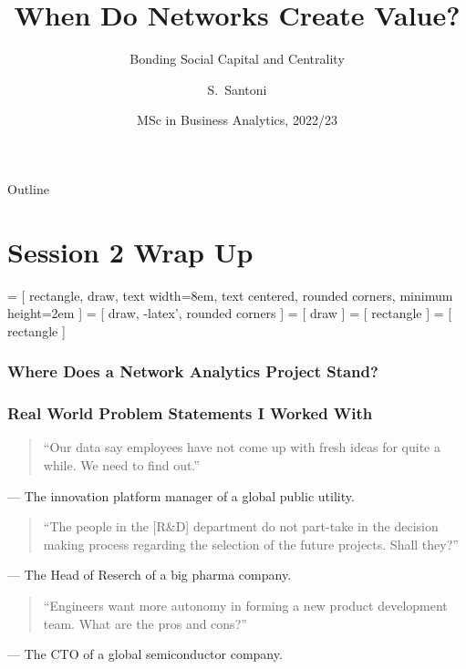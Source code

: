 \documentclass[notes, aspectratio=1610]{beamer}
\title[Networks and Value Creation]
{When Do Networks Create Value?}
\subtitle{Bonding Social Capital and Centrality}
\author{S.~Santoni\inst{1}\inst{2}}
\institute{
	\inst{1}%
	Bayes Business School
	\and
	\inst{2}%
	Soundcloud
	}
\date{MSc in Business Analytics, 2022/23}
\begin{document}
\begin{frame}
	\titlepage
\end{frame}

\begin{frame}{Outline}
	\tableofcontents
\end{frame}

\section{Session 2 Wrap Up}

\begin{frame}
 = [
	rectangle, 
	draw,
	text width=8em,
	text centered,
	rounded corners,
	minimum height=2em
	]
 = [
	draw,
	-latex',
	rounded corners
	]
 = [
	draw
	]
 = [
	rectangle
	]
 = [
	rectangle
	]
	\frametitle{Where Does a Network Analytics Project Stand?}
	\begin{figure}
	\end{figure}	
\end{frame}

\begin{frame}
	\frametitle{Real World Problem Statements I Worked With}
	\begin{quote}
		``Our data say employees have not come up with 
		fresh ideas for quite a while. We need to find out.''
	\end{quote}
	\raggedleft --- The innovation platform manager of a global public utility.

	\vspace{1em}

	\begin{quote}
		``The people in the [R\&D] department do not part-take in 
		the decision making process regarding the selection 
		of the future projects. Shall they?''
	\end{quote}
	\raggedleft --- The Head of Reserch of a big pharma company.
	\vspace{1em}

	\begin{quote}
		``Engineers want more autonomy in forming a new product 
		development team. What are the pros and cons?''
	\end{quote}
	\raggedleft --- The CTO of a global semiconductor company.
\end{frame}
\end{document}
